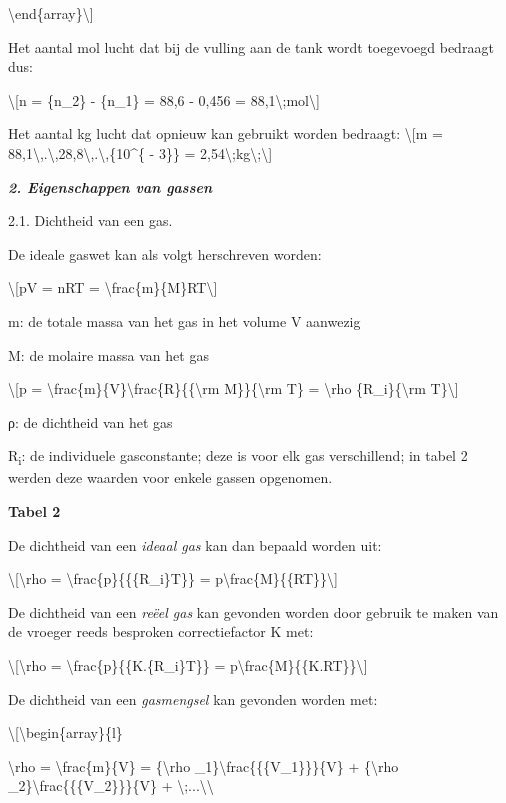 \documentclass[]{article}
\begin{document}
\textbackslash{}end\{array\}\textbackslash{}{]}

Het aantal mol lucht dat bij de vulling aan de tank wordt toegevoegd
bedraagt dus:

\textbackslash{}{[}n = \{n\_2\} - \{n\_1\} = 88,6 - 0,456 =
88,1\textbackslash{};mol\textbackslash{}{]}

Het aantal kg lucht dat opnieuw kan gebruikt worden bedraagt:
\textbackslash{}{[}m =
88,1\textbackslash{},.\textbackslash{},28,8\textbackslash{},.\textbackslash{},\{10\^{}\{
- 3\}\} = 2,54\textbackslash{};kg\textbackslash{};\textbackslash{}{]}

\emph{\textbf{2. Eigenschappen van gassen}}

2.1. Dichtheid van een gas.

De ideale gaswet kan als volgt herschreven worden:

\textbackslash{}{[}pV = nRT =
\textbackslash{}frac\{m\}\{M\}RT\textbackslash{}{]}

m: de totale massa van het gas in het volume V aanwezig

M: de molaire massa van het gas

\textbackslash{}{[}p =
\textbackslash{}frac\{m\}\{V\}\textbackslash{}frac\{R\}\{\{\textbackslash{}rm
M\}\}\{\textbackslash{}rm T\} = \textbackslash{}rho
\{R\_i\}\{\textbackslash{}rm T\}\textbackslash{}{]}

ρ: de dichtheid van het gas

R\textsubscript{i}: de individuele gasconstante; deze is voor elk gas
verschillend; in tabel 2 werden deze waarden voor enkele gassen
opgenomen.

\textbf{Tabel 2}

De dichtheid van een \emph{ideaal gas} kan dan bepaald worden uit:

\textbackslash{}{[}\textbackslash{}rho =
\textbackslash{}frac\{p\}\{\{\{R\_i\}T\}\} =
p\textbackslash{}frac\{M\}\{\{RT\}\}\textbackslash{}{]}

De dichtheid van een \emph{reëel gas} kan gevonden worden door gebruik
te maken van de vroeger reeds besproken correctiefactor K met:

\textbackslash{}{[}\textbackslash{}rho =
\textbackslash{}frac\{p\}\{\{K.\{R\_i\}T\}\} =
p\textbackslash{}frac\{M\}\{\{K.RT\}\}\textbackslash{}{]}

De dichtheid van een \emph{gasmengsel} kan gevonden worden met:

\textbackslash{}{[}\textbackslash{}begin\{array\}\{l\}

\textbackslash{}rho = \textbackslash{}frac\{m\}\{V\} =
\{\textbackslash{}rho \_1\}\textbackslash{}frac\{\{\{V\_1\}\}\}\{V\} +
\{\textbackslash{}rho \_2\}\textbackslash{}frac\{\{\{V\_2\}\}\}\{V\} +
\textbackslash{};...\textbackslash{}\textbackslash{}
\end{document}
